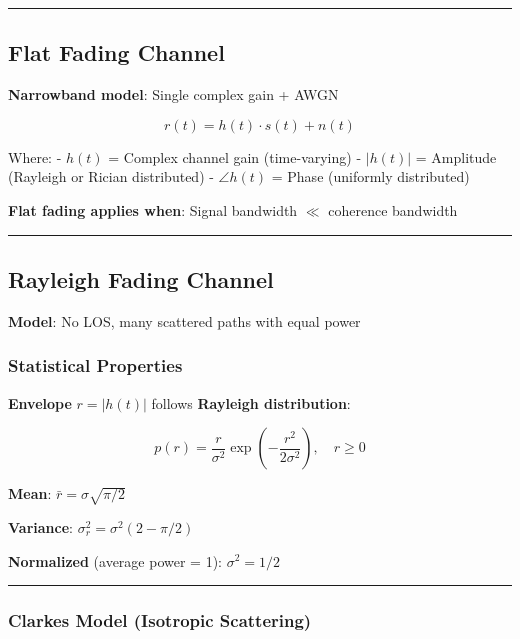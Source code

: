 \begin{center}\rule{0.5\linewidth}{0.5pt}\end{center}

\subsection{Flat Fading Channel}\label{flat-fading-channel}

\textbf{Narrowband model}: Single complex gain + AWGN

\[
r(t) = h(t) \cdot s(t) + n(t)
\]

Where: - \(h(t)\) = Complex channel gain (time-varying) - \(|h(t)|\) =
Amplitude (Rayleigh or Rician distributed) - \(\angle h(t)\) = Phase
(uniformly distributed)

\textbf{Flat fading applies when}: Signal bandwidth \(\ll\) coherence
bandwidth

\begin{center}\rule{0.5\linewidth}{0.5pt}\end{center}

\subsection{Rayleigh Fading Channel}\label{rayleigh-fading-channel}

\textbf{Model}: No LOS, many scattered paths with equal power

\subsubsection{Statistical Properties}\label{statistical-properties}

\textbf{Envelope} \(r = |h(t)|\) follows \textbf{Rayleigh distribution}:

\[
p(r) = \frac{r}{\sigma^2} \exp\left(-\frac{r^2}{2\sigma^2}\right), \quad r \geq 0
\]

\textbf{Mean}: \(\bar{r} = \sigma\sqrt{\pi/2}\)

\textbf{Variance}: \(\sigma_r^2 = \sigma^2(2 - \pi/2)\)

\textbf{Normalized} (average power = 1): \(\sigma^2 = 1/2\)

\begin{center}\rule{0.5\linewidth}{0.5pt}\end{center}

\subsubsection{Clarke\textquotesingle s Model (Isotropic
Scattering)}\label{clarkes-model-isotropic-scattering}

